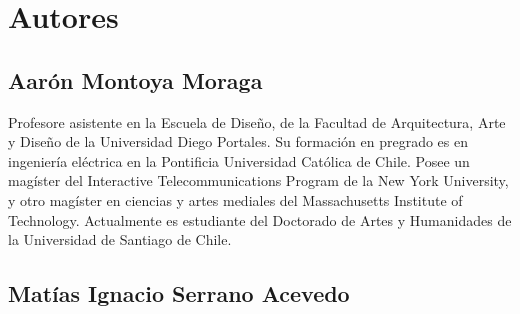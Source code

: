 \documentclass[../principal.tex]{subfiles}
\begin{document}

\section{Autores}

\subsection{Aarón Montoya Moraga}

Profesore asistente en la Escuela de Diseño, de la Facultad de Arquitectura, Arte y Diseño de la Universidad Diego Portales. Su formación en pregrado es en ingeniería eléctrica en la Pontificia Universidad Católica de Chile. Posee un magíster del Interactive Telecommunications Program de la New York University, y otro magíster en ciencias y artes mediales del Massachusetts Institute of Technology. Actualmente es estudiante del Doctorado de Artes y Humanidades de la Universidad de Santiago de Chile.

\subsection{Matías Ignacio Serrano Acevedo}


\newpage
\end{document}
